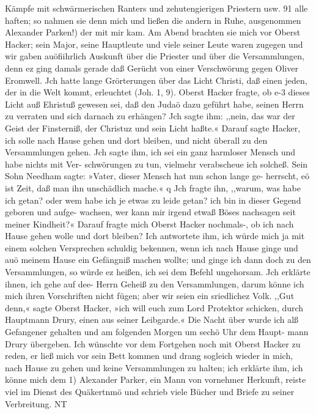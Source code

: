 Kämpfe mit schwärmerischen Ranters und zehutengierigen Priestern usw. 91
alle haften; so nahmen sie denn mich und ließen die andern in
Ruhe, ausgenommen Alexander Parken!) der mit mir kam. Am
Abend brachten sie mich vor Oberst Hacker; sein Major, seine
Hauptleute und viele seiner Leute waren zugegen und wir gaben
auöfiihrlich Auskunft über die Priester und über die Versammlungen,
denn ez ging damals gerade daß Gerücht von einer Verschwörung
gegen Oliver Eromwell. Jch hatte lange Grörterungen über das
Licht Christi, daß einen jeden, der in die Welt kommt, erleuchtet
(Joh. 1, 9). Oberst Hacker fragte, ob e-3 dieses Licht auß Ehristuß
gewesen sei, daß den Judaö dazu geführt habe, seinen Herrn zu
verraten und sich darnach zu erhängen? Jch sagte ihm: ,,nein,
das war der Geist der Finsterniß, der Christuz und sein Licht
haßte.« Darauf sagte Hacker, ich solle nach Hause gehen und dort
bleiben, und nicht überall zu den Versammlungen gehen. Jch sagte
ihm, ich sei ein ganz harmloser Mensch und habe nichts mit Ver-
schwörungen zu tun, vielmehr verabscheue ich solcheß. Sein Sohn
Needham sagte: »Vater, dieser Mensch hat nun schon lange ge-
herrscht, eö ist Zeit, daß man ihn unschädlich mache.« q Jch fragte
ihn, ,,warum, was habe ich getan? oder wem habe ich je etwas
zu leide getan? ich bin in dieser Gegend geboren und aufge-
wachsen, wer kann mir irgend etwaß Böses nachsagen seit meiner
Kindheit?« Darauf fragte mich Oberst Hacker nochmals-, ob ich
nach Hause gehen wolle und dort bleiben? Ich antwortete ihm,
ich würde mich ja mit einem solchen Versprechen schuldig bekennen,
wenn ich nach Hause ginge und auö meinem Hause ein Gefängniß
machen wollte; und ginge ich dann doch zu den Versammlungen, so
würde ez heißen, ich sei dem Befehl ungehorsam. Jch erklärte
ihnen, ich gehe auf dee- Herrn Geheiß zu den Versammlungen,
darum könne ich mich ihren Vorschriften nicht fügen; aber wir
seien ein sriedlichez Volk. ,,Gut denn,« sagte Oberst Hacker, »ich will
euch zum Lord Protektor schicken, durch Hauptmann Drury, einen
aus seiner Leibgarde.« Die Nacht über wurde ich alß Gefangener
gehalten und am folgenden Morgen um sechö Uhr dem Haupt-
mann Drury übergeben. Ich wünschte vor dem Fortgehen noch
mit Oberst Hacker zu reden, er ließ mich vor sein Bett kommen und
drang sogleich wieder in mich, nach Hause zu gehen und keine
Versammlungen zu halten; ich erklärte ihm, ich könne mich dem
1) Alexander Parker, ein Mann von vornehmer Herkunft, reiste viel im
Dienst des Quäkertnmö und schrieb viele Bücher und Briefe zu seiner Verbreitung. NT


